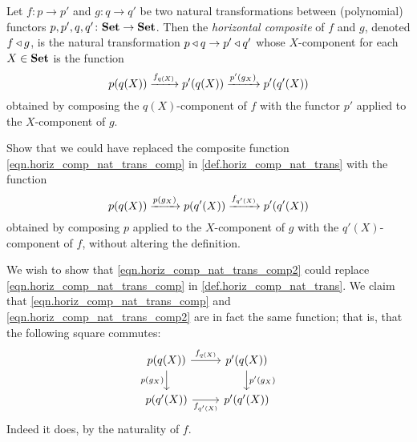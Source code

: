 \documentclass[Book-Poly]{subfiles}
\begin{document}
\begin{definition}\label{def.horiz_comp_nat_trans}
Let $f\colon p\to p'$ and $g\colon q\to q'$ be two natural transformations between (polynomial) functors $p,p',q,q'\colon\mathbf{Set}\to\mathbf{Set}$.
Then the \emph{horizontal composite} of $f$ and $g$, denoted $f\mathbin{\triangleleft} g$, is the natural transformation $p\mathbin{\triangleleft} q\to p'\mathbin{\triangleleft} q'$ whose $X$-component for each $X\in\mathbf{Set}$ is the function
\begin{equation} \label{eqn.horiz_comp_nat_trans_comp}
    p(q(X)) \xrightarrow{f_{q(X)}} p'(q(X)) \xrightarrow{p'(g_X)} p'(q'(X))
\end{equation}
obtained by composing the $q(X)$-component of $f$ with the functor $p'$ applied to the $X$-component of $g$.
\end{definition}

\begin{exercise}
Show that we could have replaced the composite function \eqref{eqn.horiz_comp_nat_trans_comp} in \cref{def.horiz_comp_nat_trans} with the function
\begin{equation} \label{eqn.horiz_comp_nat_trans_comp2}
    p(q(X)) \xrightarrow{p(g_X)} p(q'(X)) \xrightarrow{f_{q'(X)}} p'(q'(X))
\end{equation}
obtained by composing $p$ applied to the $X$-component of $g$ with the $q'(X)$-component of $f$, without altering the definition.
\begin{solution}
We wish to show that \eqref{eqn.horiz_comp_nat_trans_comp2} could replace \eqref{eqn.horiz_comp_nat_trans_comp} in \cref{def.horiz_comp_nat_trans}.
We claim that \eqref{eqn.horiz_comp_nat_trans_comp} and \eqref{eqn.horiz_comp_nat_trans_comp2} are in fact the same function; that is, that the following square commutes:
\[
\begin{tikzcd}
    p(q(X)) \ar[r, "f_{q(X)}"]\ar[d, "p(g_X)"'] & p'(q(X)) \ar[d, "p'(g_X)"] \\
    p(q'(X)) \ar[r, "f_{q'(X)}"'] & p'(q'(X))
\end{tikzcd}
\]
Indeed it does, by the naturality of $f$.
\end{solution}
\end{exercise}
\end{document}
